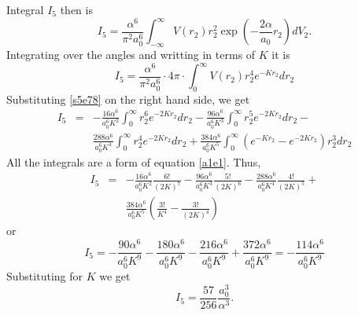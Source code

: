 \documentclass{article}
\numberwithin{equation}{section}
\begin{document}
Integral $I_5$ then is
\[
I_5 = \frac{\alpha^6}{\pi^2 a_0^6}\int_{-\infty}^\infty V(r_2)r_2^2
\exp\left(-\frac{2\alpha}{a_0}r_2\right)dV_2.
\]
Integrating over the angles and writting in terms of $K$ it is
\[
I_5 = \frac{\alpha^6}{\pi^2 a_0^6}\cdot 4\pi\cdot 
      \int_0^\infty V(r_2)r_2^4 e^{-Kr_2} dr_2
\]
Substituting \eqref{s5e78} on the right hand side, we get
\begin{eqnarray*}
I_5 &=& -\frac{16\alpha^6}{a_0^6K^2}\int_0^\infty r_2^6e^{-2Kr_2}dr_2 - 
  \frac{96\alpha^6}{a_0^6K^3}\int_0^\infty r_2^5e^{-2Kr_2}dr_2 - \\
 & & \frac{288\alpha^6}{a_0^6K^4}\int_0^\infty r_2^4e^{-2Kr_2}dr_2 + 
 \frac{384\alpha^6}{a_0^6 K^5}\int_0^\infty(e^{-Kr_2}-e^{-2Kr_2})r_2^3dr_2
\end{eqnarray*}
All the integrals are a form of equation \eqref{a1e1}. Thus,
\begin{eqnarray*}
I_5 &=& -\frac{16\alpha^6}{a_0^6K^2}\frac{6!}{(2K)^7} -
 \frac{96\alpha^6}{a_0^6K^3}\frac{5!}{(2K)^6} - 
 \frac{288\alpha^6}{a_0^6K^4}\frac{4!}{(2K)^5} + \\
 & & \frac{384\alpha^6}{a_0^6 K^5}\left(\frac{3!}{K^4} - \frac{3!}{(2K)^4}
	 \right)
\end{eqnarray*}
or
\[
I_5 = -\frac{90\alpha^6}{a_0^6K^9} - \frac{180\alpha^6}{a_0^6K^9} - 
 \frac{216\alpha^6}{a_0^6K^9} + \frac{372\alpha^6}{a_0^6 K^9}
 = -\frac{114\alpha^6}{a_0^6K^9}
\]
Substituting for $K$ we get
\begin{equation}\label{s5e79}
I_5 = \frac{57}{256}\frac{a_0^3}{\alpha^3}.
\end{equation}
\end{document}
